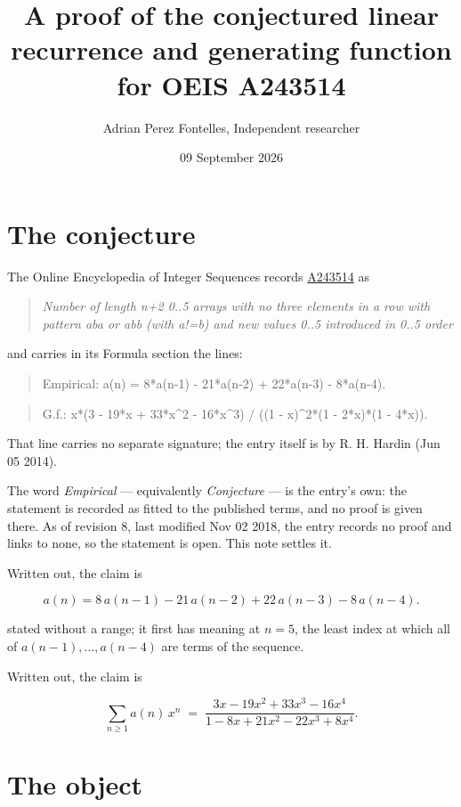 \documentclass[11pt]{article}
\title{A proof of the conjectured linear recurrence and generating function for OEIS A243514}
\author{Adrian Perez Fontelles, Independent researcher}
\date{09 September 2026}
\theoremstyle{definition}
\begin{document}
\maketitle
\section{The conjecture}

The Online Encyclopedia of Integer Sequences records \href{https://oeis.org/A243514}{A243514} as

\begin{quote}\itshape Number of length n+2 0..5 arrays with no three elements in a row with pattern aba or abb (with a!=b) and new values 0..5 introduced in 0..5 order\end{quote}

and carries in its Formula section the lines:

\begin{quote}\ttfamily Empirical: a(n) = 8*a(n-1) - 21*a(n-2) + 22*a(n-3) - 8*a(n-4).\end{quote}

\begin{quote}\ttfamily G.f.: x*(3 - 19*x + 33*x\textasciicircum{}2 - 16*x\textasciicircum{}3) / ((1 - x)\textasciicircum{}2*(1 - 2*x)*(1 - 4*x)).\end{quote}

That line carries no separate signature; the entry itself is by R. H. Hardin (Jun 05 2014).

The word {\itshape Empirical} --- equivalently {\itshape Conjecture} --- is the entry's own: the statement is recorded as fitted to the published terms, and no proof is given there. As of revision 8, last modified Nov 02 2018, the entry records no proof and links to none, so the statement is open. This note settles it.

Written out, the claim is

\[a(n) = 8\,a(n-1) - 21\,a(n-2) + 22\,a(n-3) - 8\,a(n-4).\]

stated without a range; it first has meaning at $n = 5$, the least index at which all of $a(n-1),\dots,a(n-4)$ are terms of the sequence.

Written out, the claim is

\[\sum_{n \ge 1} a(n)\,x^n \;=\; \frac{3x - 19x^{2} + 33x^{3} - 16x^{4}}{1 - 8x + 21x^{2} - 22x^{3} + 8x^{4}}.\]

\section{The object}
\end{document}
